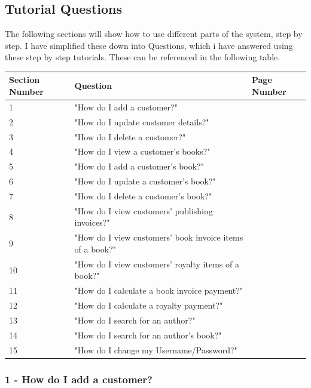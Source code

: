 \subsection{Tutorial Questions}

The following sections will show how to use different parts of the system, step by step. I have simplified these down into Questions, which i have answered using these step by step tutorials. These can be referenced in the following table.

\begin{center}
\begin{tabular}{|p{3cm}|p{3cm}|p{3cm}|}
        \hline
        \textbf{Section Number} & \textbf{Question} & \textbf{Page Number} \\ \hline
        1 & "How do I add a customer?" & \\ \hline
        2 & "How do I update customer details?" & \\ \hline
        3 & "How do I delete a customer?" & \\ \hline
        4 & "How do I view a customer's books?" & \\ \hline
        5 & "How do I add a customer's book?" & \\ \hline
        6 & "How do I update a customer's book?" & \\ \hline
        7 & "How do I delete a customer's book?" & \\ \hline
        8 & "How do I view customers' publishing invoices?" & \\ \hline
        9 & "How do I view customers' book invoice items of a book?" & \\ \hline
        10 & "How do I view customers' royalty items of a book?" & \\ \hline
        11 & "How do I calculate a book invoice payment?" & \\ \hline
        12 & "How do I calculate a royalty payment?" & \\ \hline
        13 & "How do I search for an author?" & \\ \hline
        14 & "How do I search for an author's book?"  \\ \hline
        15 & "How do I change my Username/Password?" & \\ \hline
\end{tabular}
\end{center}

\subsubsection{1 - How do I add a customer?}

